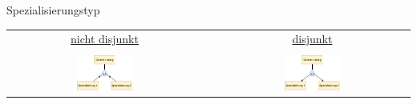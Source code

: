 \begin{defi}{Spezialisierungstyp}
    \begin{center}
        \begin{tabular}{ccc}
            \underline{nicht disjunkt} & \quad & \underline{disjunkt}                                      \\
            \\
            \includegraphics[width=0.3\textwidth]{includes/figures/definition_specialization_not_disjunct.pdf}
                                       & \quad &
            \includegraphics[width=0.3\textwidth]{includes/figures/definition_specialization_disjunct.pdf} \\
        \end{tabular}
    \end{center}

\end{defi}

